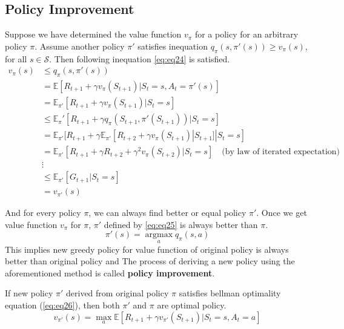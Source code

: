 \documentclass[
	10pt, %
]{article}
\theoremstyle{plain}
\newcommand{\mbb}[1]{\mathbb{#1}}
\newcommand{\mc}[1]{\mathcal{#1}}
\newcommand{\tb}[1]{\textbf{#1}}
\numberwithin{equation}{subsection} %
\newcommand{\argmax}{\mathop{\mathrm{argmax}}\limits}
\begin{document}
\subsection{Policy Improvement}
Suppose we have determined the value function $v_\pi$ for a policy for an arbitrary policy $\pi$. Assume another policy $\pi'$ satisfies inequation $q_\pi(s, \pi'(s)) \geq v_\pi(s)$, for all $s \in \mc{S}$. Then following inequation \cref{eq:eq24} is satisfied.
\begin{equation} \label{eq:eq24}
    \begin{aligned}
        v_\pi(s) &\leq q_\pi(s, \pi'(s))\\
        &=\mbb{E}[R_{t+1} + \gamma v_\pi(S_{t+1}) | S_t=s, A_t=\pi'(s)]\\
        &=\mbb{E}_{\pi'}[R_{t+1} + \gamma v_\pi (S_{t+1}) | S_{t}=s]\\
        &\leq \mbb{E}_\pi'[R_{t+1} + \gamma q_\pi(S_{t+1}, \pi'(S_{t+1}))|S_t=s]\\
        &= \mbb{E}_{\pi'}[R_{t+1} + \gamma\mbb{E}_{\pi'}[R_{t+2} + \gamma v_\pi(S_{t+1})|S_{t+1}]|S_t=s]\\
        &= \mbb{E}_{\pi'}[R_{t+1}+\gamma R_{t+2} + \gamma^2 v_\pi (S_{t+2}) |S_t=s] \quad \text{(by law of iterated expectation)}\\
        &\vdots\\
        &\leq \mbb{E}_{\pi'}[G_{t+1}|S_t=s]\\
        &= v_{\pi'}(s)
    \end{aligned}
\end{equation}

And for every policy $\pi$, we can always find better or equal policy $\pi'$. Once we get value function $v_\pi$ for $\pi$, $\pi'$ defined by \cref{eq:eq25} is always better than $\pi$.
\begin{equation} \label{eq:eq25}
    \pi'(s) = \argmax_a q_\pi(s,a)
\end{equation}
This implies new greedy policy for value function of original policy is always better than original policy and The process of deriving a new policy using the aforementioned method is called \tb{policy improvement}.

If new policy $\pi'$ derived from original policy $\pi$ satisfies bellman optimality equation (\cref{eq:eq26}), then both $\pi'$ and $\pi$ are optimal policy.
\begin{equation} \label{eq:eq26}
    v_{\pi'}(s) = \max_a \mbb{E}[R_{t+1} + \gamma v_{\pi'}(S_{t+1}) | S_t=s, A_t=a]
\end{equation}
\end{document}
